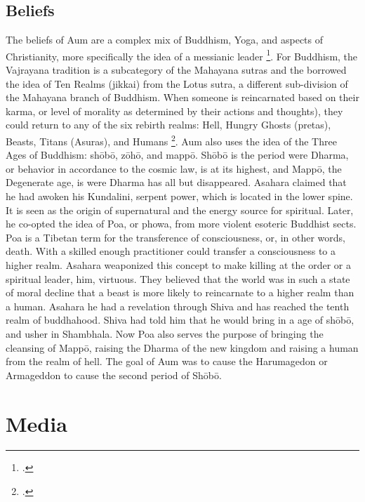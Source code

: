 \documentclass[12pt, letterpaper]{article}
\begin{document}
\subsection{Beliefs}
The beliefs of Aum are a complex mix of Buddhism, Yoga, and aspects of Christianity, more specifically the
idea of a messianic leader \footcite[1144]{metraux_religious_1995}. For Buddhism, the Vajrayana tradition is 
a
subcategory of the Mahayana sutras and the borrowed the idea of Ten Realms (jikkai) from the Lotus sutra, a
different sub-division of the Mahayana branch of Buddhism. When someone is reincarnated based on their karma,
or level of morality as determined by their actions and thoughts), they could return to any of the six rebirth realms: 
Hell, Hungry Ghosts (pretas), Beasts, Titans (Asuras), and Humans \footcite[83]{watanabe_religion_1998}. Aum also uses the idea of the Three Ages 
of Buddhism: sh\=ob\=o, z\=oh\=o, and mapp\=o. Sh\=ob\=o is the period were Dharma, or behavior in accordance
to the cosmic law, is at its highest, and Mapp\=o, the Degenerate age, is were Dharma has all but 
disappeared. Asahara claimed that he had awoken his Kundalini, serpent power, which is located in the lower
spine. It is seen as the origin of supernatural and the energy source for spiritual. Later, he co-opted the
idea of Poa, or phowa, from more violent esoteric Buddhist sects. Poa is a Tibetan term for the transference
of consciousness, or, in other words, death. With a skilled enough practitioner could transfer a 
consciousness to a higher realm. Asahara weaponized this concept to make killing at the order or a spiritual
leader, him, virtuous. They believed that the world was in such a state of moral decline that a beast is more
likely to reincarnate to a higher realm than a human. Asahara he had a revelation through Shiva and has
reached the tenth realm of buddhahood. Shiva had told him that he would bring in a age of sh\=ob\=o, and
usher in Shambhala. Now Poa also serves the purpose of bringing the cleansing of Mapp\=o, raising the Dharma
of the new kingdom and raising a human from the realm of hell. The goal of Aum was to cause the Harumagedon 
or Armageddon to cause the second period of Sh\=ob\=o.

\section{Media}
\end{document}
